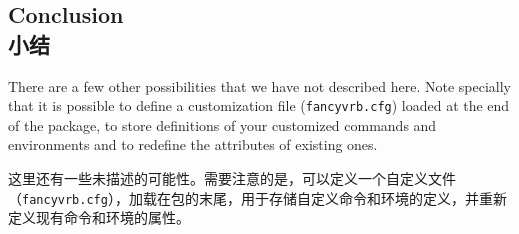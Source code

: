 \documentclass[twoside]{article}
\begin{document}
\begin{changebar}
\iffalse

\section{Thanks\\致谢}

For interesting comments and suggestions, we would like to thank specially
(alphabetic order): Philippe \textsc{Esperet}
\url{esperet@marie.polytechnique.fr}, Michael \textsc{Friendly}
\url{friendly@hotspur.psych.yorku.ca}, Rolf \textsc{Niepraschk}
\url{niepraschk@gmx.de} and for bug reports Mario \textsc{Hassler}
\relax\unskip\break
\url{HASSLER@ippnv2.ipp.kfa-juelich.de}, Mikhail \textsc{Kolodin}
\relax\unskip\break
\url{myke@morrigan.spb.su}, Andreas Matthias, Ulrich M. Schwarz, and Vladimir \textsc{Volovich}
\verb+<vvv@vvv.vsu.ru>+.

我们要特别感谢 Philippe \textsc{Esperet} \url{esperet@marie.polytechnique.fr}、Michael \textsc{Friendly} \url{friendly@hotspur.psych.yorku.ca}、Rolf \textsc{Niepraschk} \url{niepraschk@gmx.de} 等人对此的有趣评论和建议，以及对错误报告的 Mario \textsc{Hassler} \relax\unskip\break
\url{HASSLER@ippnv2.ipp.kfa-juelich.de}、Mikhail \textsc{Kolodin} \relax\unskip\break
\url{myke@morrigan.spb.su}、Andreas Matthias、Ulrich M. Schwarz 和 Vladimir \textsc{Volovich} \verb+vvv@vvv.vsu.ru+。

\fi

\section{Conclusion\\小结}

There are a few other possibilities that we have not described here.
Note specially that it is possible to define a customization file
(\texttt{fancyvrb.cfg}) loaded at the end of the package, to store
definitions of your customized commands and environments and to redefine
the attributes of existing ones.

这里还有一些未描述的可能性。需要注意的是，可以定义一个自定义文件（\texttt{fancyvrb.cfg}），加载在包的末尾，用于存储自定义命令和环境的定义，并重新定义现有命令和环境的属性。



\clearpage


\end{changebar}
\end{document}
